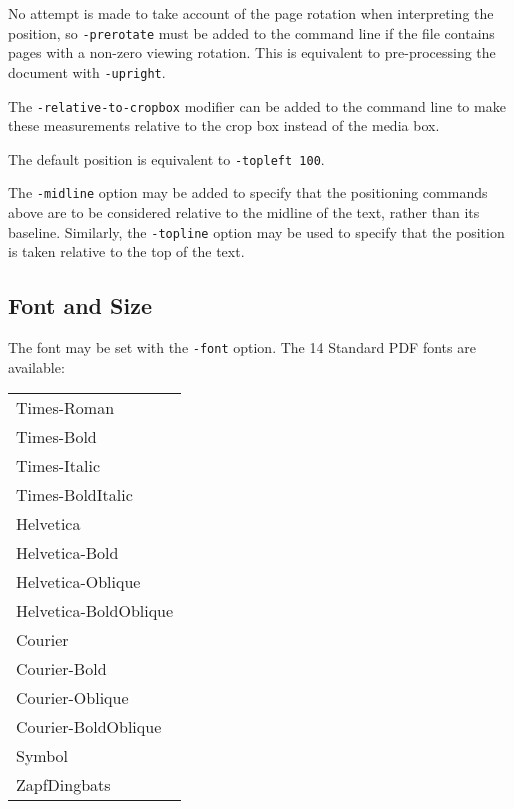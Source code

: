 \documentclass{book}
\begin{document}
\noindent No attempt is made to take account of the page rotation when interpreting the
position, so \texttt{-prerotate} must be added to the command line if the file
contains pages with a non-zero viewing rotation. This is equivalent to
pre-processing the document with \texttt{-upright}.
   

The \texttt{-relative-to-cropbox} modifier can be added to the command line to
make these measurements relative to the crop box instead of the media box.

The default position is equivalent to \texttt{-topleft 100}.

The \texttt{-midline} option may be added to specify that the positioning
commands above are to be considered relative to the midline of the text, rather
than its baseline. Similarly, the \texttt{-topline} option may be used to specify that the position is taken relative to the top of the text.

  \subsection{Font and Size}
  The font may be set with the \texttt{-font} option. The 14 Standard PDF fonts are available:

  \vspace{2mm}
  \begin{tabular}{l}
  Times-Roman\\
  Times-Bold\\
  Times-Italic\\
  Times-BoldItalic\\
  Helvetica\\
  Helvetica-Bold\\
  Helvetica-Oblique\\
  Helvetica-BoldOblique\\
  Courier\\
  Courier-Bold\\
  Courier-Oblique\\
  Courier-BoldOblique\\
  Symbol\\
  ZapfDingbats
  \end{tabular}
\end{document}
